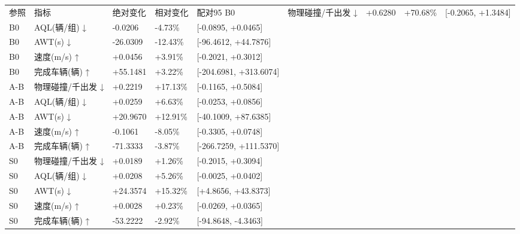 \begin{tabular}{lllll}
\toprule
参照 & 指标 & 绝对变化 & 相对变化 & 配对95%
\midrule
B0 & 物理碰撞/千出发 ↓ & +0.6280 & +70.68\% & [-0.2065, +1.3484] \\
B0 & AQL(辆/组) ↓ & -0.0206 & -4.73\% & [-0.0895, +0.0465] \\
B0 & AWT(s) ↓ & -26.0309 & -12.43\% & [-96.4612, +44.7876] \\
B0 & 速度(m/s) ↑ & +0.0456 & +3.91\% & [-0.2021, +0.3012] \\
B0 & 完成车辆(辆) ↑ & +55.1481 & +3.22\% & [-204.6981, +313.6074] \\
A-B & 物理碰撞/千出发 ↓ & +0.2219 & +17.13\% & [-0.1165, +0.5084] \\
A-B & AQL(辆/组) ↓ & +0.0259 & +6.63\% & [-0.0253, +0.0856] \\
A-B & AWT(s) ↓ & +20.9670 & +12.91\% & [-40.1009, +87.6385] \\
A-B & 速度(m/s) ↑ & -0.1061 & -8.05\% & [-0.3305, +0.0748] \\
A-B & 完成车辆(辆) ↑ & -71.3333 & -3.87\% & [-266.7259, +111.5370] \\
S0 & 物理碰撞/千出发 ↓ & +0.0189 & +1.26\% & [-0.2015, +0.3094] \\
S0 & AQL(辆/组) ↓ & +0.0208 & +5.26\% & [-0.0025, +0.0402] \\
S0 & AWT(s) ↓ & +24.3574 & +15.32\% & [+4.8656, +43.8373] \\
S0 & 速度(m/s) ↑ & +0.0028 & +0.23\% & [-0.0269, +0.0365] \\
S0 & 完成车辆(辆) ↑ & -53.2222 & -2.92\% & [-94.8648, -4.3463] \\
\bottomrule
\end{tabular}